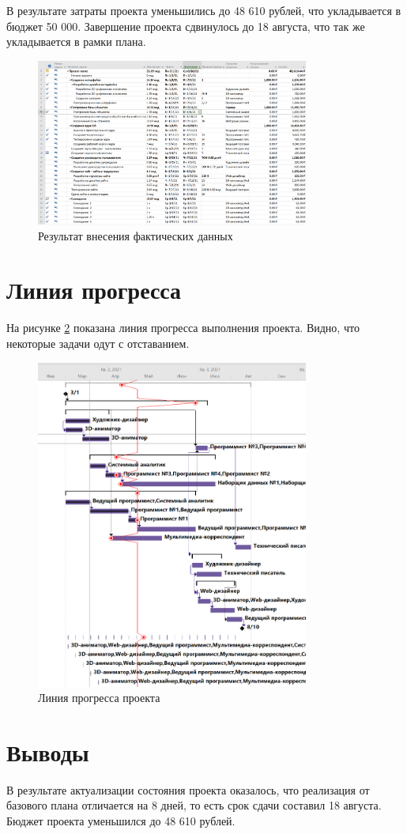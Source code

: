В результате затраты проекта уменьшились до 48 610 рублей, что укладывается в бюджет 50 000. Завершение проекта сдвинулось до 18 августа, что так же укладывается в рамки плана.

\begin{figure}[H]
    \centering
    \includegraphics[width=0.8\textwidth]{img/content/final.png}
    \caption{Результат внесения фактических данных}
    \label{fig:final}
\end{figure}

\section{Линия прогресса}

На рисунке \ref{fig:lines} показана линия прогресса выполнения проекта. Видно, что некоторые задачи одут с отставанием.

\begin{figure}[H]
    \centering
    \includegraphics[width=0.8\textwidth]{img/content/lines.png}
    \caption{Линия прогресса проекта}
    \label{fig:lines}
\end{figure}

\section{Выводы}

В результате актуализации состояния проекта оказалось, что реализация от базового плана отличается на 8 дней, то есть срок сдачи составил 18 августа. Бюджет проекта уменьшился до 48 610 рублей.
